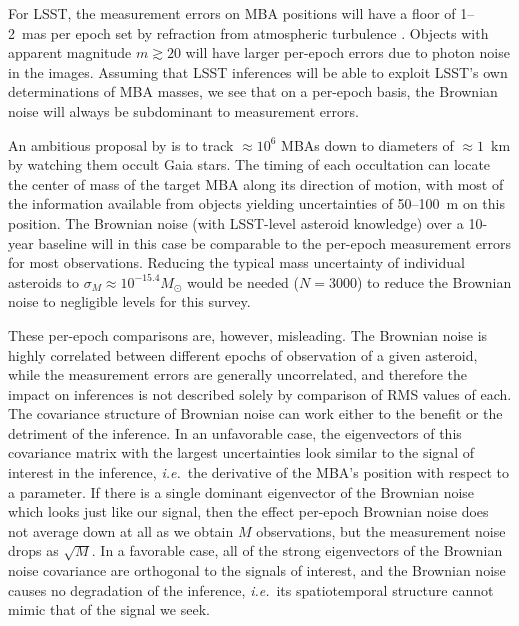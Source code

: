 \documentclass[linenumbers, onecolumn]{aastex631}
\newcommand{\ie}{\textit{i.e.\/}}
\begin{document}
For LSST, the measurement errors on MBA positions will have a floor of 1--2~mas per epoch set by refraction from atmospheric turbulence \citep{willow,trojans}.  Objects with apparent magnitude $m\gtrsim20$ will have larger per-epoch errors due to photon noise in the images.  Assuming that LSST inferences will be able to exploit LSST's own determinations of MBA masses, we see that on a per-epoch basis, the Brownian noise will always be subdominant to measurement errors.

An ambitious proposal by \citet{occultations} is to track $\approx10^6$ MBAs down to diameters of $\approx1$~km by watching them occult Gaia stars.  The timing of each occultation can locate the center of mass of the target MBA along its direction of motion, with most of the information available from objects yielding uncertainties of 50--100~m on this position.  The Brownian noise (with LSST-level asteroid knowledge) over a 10-year baseline will in this case be comparable to the per-epoch measurement errors for most observations.  Reducing the typical mass uncertainty of individual asteroids to $\sigma_M\approx 10^{-15.4} M_\odot$ would be needed ($N=3000$) to reduce the Brownian noise to negligible levels for this survey.

These per-epoch comparisons are, however, misleading. The Brownian noise is highly correlated between different epochs of observation of a given asteroid, while the measurement errors are generally uncorrelated, and therefore the impact on inferences is not described solely by comparison of RMS values of each.  The covariance structure of Brownian noise can work either to the benefit or the detriment of the inference.  In an unfavorable case, the eigenvectors of this covariance matrix with the largest uncertainties look similar to the signal of interest in the inference, \ie\ the derivative of the MBA's position with respect to a parameter.  If there is a single dominant eigenvector of the Brownian noise which looks just like our signal, then the effect per-epoch Brownian noise does not average down at all as we obtain $M$ observations, but the measurement noise drops as $\sqrt{M}.$  In a favorable case, all of the strong eigenvectors of the Brownian noise covariance are orthogonal to the signals of interest, and the Brownian noise causes no degradation of the inference, \ie\ its spatiotemporal structure cannot mimic that of the signal we seek.
\end{document}
